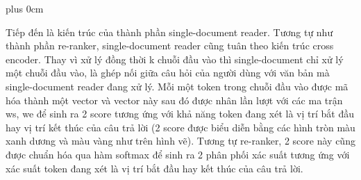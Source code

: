 \documentclass[11pt]{beamer}
\renewcommand{\raggedright}{\leftskip=0pt \rightskip=0pt plus 0cm}
\let\olditemize=\itemize
\renewenvironment{itemize}{\olditemize\raggedright}{\endlist}
\begin{document}
\begin{frame}
\begin{itemize}
	\item {\fontsize{8pt}{\baselineskip}\selectfont Tiếp đến là kiến trúc của thành phần single-document reader. Tương tự như thành phần re-ranker, single-document reader cũng tuân theo kiến trúc cross encoder. Thay vì xử lý đồng thời k chuỗi đầu vào thì single-document chỉ xử lý một chuỗi đầu vào, là ghép nối giữa câu hỏi của người dùng với văn bản mà single-document reader đang xử lý. Mỗi một token trong chuỗi đầu vào được mã hóa thành một vector và vector này sau đó được nhân lần lượt với các ma trận ws, we để sinh ra 2 score tương ứng với khả năng token đang xét là vị trí bắt đầu hay vị trí kết thúc của câu trả lời (2 score được biểu diễn bằng các hình tròn màu xanh dương và màu vàng như trên hình vẽ). Tương tự re-ranker, 2 score này cũng được chuẩn hóa qua hàm softmax để sinh ra 2 phân phối xác suất tương ứng với xác suất token đang xét là vị trí bắt đầu hay kết thúc của câu trả lời.}
\end{itemize}
\end{frame}
\end{document}
